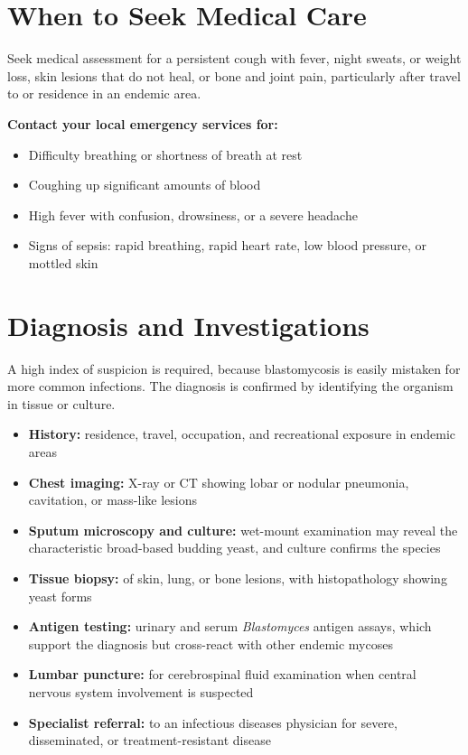 \section*{When to Seek Medical Care}
Seek medical assessment for a persistent cough with fever, night sweats, or weight loss, skin lesions that do not heal, or bone and joint pain, particularly after travel to or residence in an endemic area.

\textbf{Contact your local emergency services for:}
\begin{itemize}
    \item Difficulty breathing or shortness of breath at rest
    \item Coughing up significant amounts of blood
    \item High fever with confusion, drowsiness, or a severe headache
    \item Signs of sepsis: rapid breathing, rapid heart rate, low blood pressure, or mottled skin
\end{itemize}

\section*{Diagnosis and Investigations}
A high index of suspicion is required, because blastomycosis is easily mistaken for more common infections. The diagnosis is confirmed by identifying the organism in tissue or culture.

\begin{itemize}
    \item \textbf{History:} residence, travel, occupation, and recreational exposure in endemic areas
    \item \textbf{Chest imaging:} X-ray or CT showing lobar or nodular pneumonia, cavitation, or mass-like lesions
    \item \textbf{Sputum microscopy and culture:} wet-mount examination may reveal the characteristic broad-based budding yeast, and culture confirms the species
    \item \textbf{Tissue biopsy:} of skin, lung, or bone lesions, with histopathology showing yeast forms
    \item \textbf{Antigen testing:} urinary and serum \textit{Blastomyces} antigen assays, which support the diagnosis but cross-react with other endemic mycoses
    \item \textbf{Lumbar puncture:} for cerebrospinal fluid examination when central nervous system involvement is suspected
    \item \textbf{Specialist referral:} to an infectious diseases physician for severe, disseminated, or treatment-resistant disease
\end{itemize}

